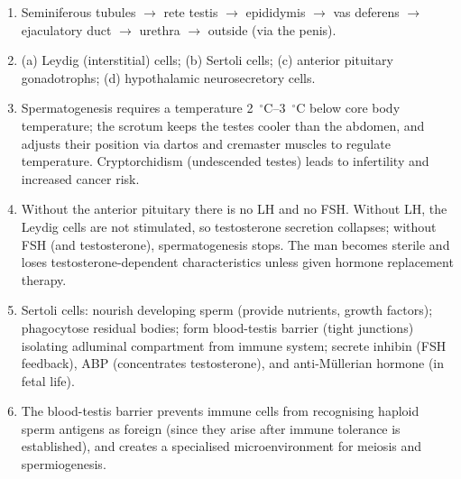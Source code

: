 \documentclass[11pt]{article}
\begin{document}
\begin{corrige}[Exercise 1]
\begin{enumerate}
\item Seminiferous tubules $\rightarrow$ rete testis $\rightarrow$ epididymis $\rightarrow$ vas deferens $\rightarrow$ ejaculatory duct $\rightarrow$ urethra $\rightarrow$ outside (via the penis).
\item (a) Leydig (interstitial) cells; (b) Sertoli cells; (c) anterior pituitary gonadotrophs; (d) hypothalamic neurosecretory cells.
\item Spermatogenesis requires a temperature \SI{2}{\ensuremath{{}^{\circ}\mathrm{C}}}--\SI{3}{\ensuremath{{}^{\circ}\mathrm{C}}} below core body temperature; the scrotum keeps the testes cooler than the abdomen, and adjusts their position via dartos and cremaster muscles to regulate temperature. Cryptorchidism (undescended testes) leads to infertility and increased cancer risk.
\item Without the anterior pituitary there is no LH and no FSH. Without LH, the Leydig cells are not stimulated, so testosterone secretion collapses; without FSH (and testosterone), spermatogenesis stops. The man becomes sterile and loses testosterone-dependent characteristics unless given hormone replacement therapy.
\item Sertoli cells: nourish developing sperm (provide nutrients, growth factors); phagocytose residual bodies; form blood-testis barrier (tight junctions) isolating adluminal compartment from immune system; secrete inhibin (FSH feedback), ABP (concentrates testosterone), and anti-Müllerian hormone (in fetal life).
\item The blood-testis barrier prevents immune cells from recognising haploid sperm antigens as foreign (since they arise after immune tolerance is established), and creates a specialised microenvironment for meiosis and spermiogenesis.
\end{enumerate}
\end{corrige}
\end{document}
